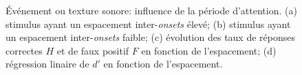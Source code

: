 \begin{figure}[t]
        \myfloatalign
         \par
        \caption[Événement ou texture sonore: influence de la période d'attention.]{Événement ou texture sonore: influence de la période d'attention. (a) stimulus ayant un espacement inter-\emph{onsets} élevé; (b) stimulus ayant un espacement inter-\emph{onsets} faible; (c) évolution des taux de réponses correctes $H$ et de faux positif $F$ en fonction de l'espacement; (d) régression linaire de $d'$ en fonction de l'espacement.}\label{fig:xptexture}
\end{figure}

